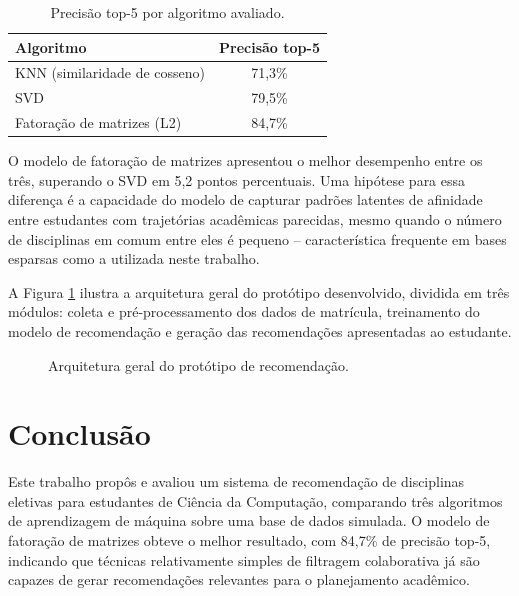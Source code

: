 \documentclass[a4paper,12pt]{article}
\begin{document}
\begin{table}[ht]
  \centering
  \caption{Precisão top-5 por algoritmo avaliado.}
  \label{tab:resultados}
  \begin{tabular}{lc}
    \hline
    Algoritmo & Precisão top-5 \\ \hline
    KNN (similaridade de cosseno) & 71,3\% \\
    SVD & 79,5\% \\
    Fatoração de matrizes (L2) & 84,7\% \\ \hline
  \end{tabular}
\end{table}

O modelo de fatoração de matrizes apresentou o melhor desempenho entre os
três, superando o SVD em 5,2 pontos percentuais. Uma hipótese para essa
diferença é a capacidade do modelo de capturar padrões latentes de
afinidade entre estudantes com trajetórias acadêmicas parecidas, mesmo
quando o número de disciplinas em comum entre eles é pequeno --
característica frequente em bases esparsas como a utilizada neste
trabalho.

A Figura \ref{fig:arquitetura} ilustra a arquitetura geral do protótipo
desenvolvido, dividida em três módulos: coleta e pré-processamento dos
dados de matrícula, treinamento do modelo de recomendação e geração das
recomendações apresentadas ao estudante.

\begin{figure}[ht]
  \centering
  \caption{Arquitetura geral do protótipo de recomendação.}
  \label{fig:arquitetura}
\end{figure}

\section{Conclusão}

Este trabalho propôs e avaliou um sistema de recomendação de disciplinas
eletivas para estudantes de Ciência da Computação, comparando três
algoritmos de aprendizagem de máquina sobre uma base de dados simulada.
O modelo de fatoração de matrizes obteve o melhor resultado, com 84,7\%
de precisão top-5, indicando que técnicas relativamente simples de
filtragem colaborativa já são capazes de gerar recomendações relevantes
para o planejamento acadêmico.
\end{document}
